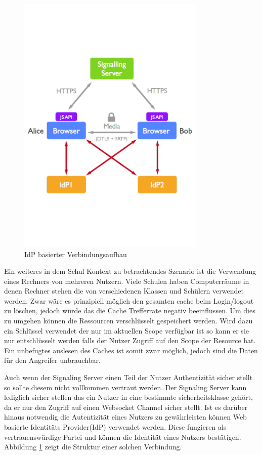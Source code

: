 \begin{figure}[!h]
	\centering
	\includegraphics[width=0.8\textwidth]{figures/user_auth}
	\caption[A Figure Short-Title]{IdP basierter Verbindungsaufbau\cite{rtcweb-security}}
	\label{fig:user_auth}
\end{figure}

Ein weiteres in dem Schul Kontext zu betrachtendes Szenario ist die Verwendung eines Rechners von mehreren Nutzern. Viele Schulen haben Computerräume in denen Rechner stehen die von verschiedenen Klassen und Schülern verwendet werden. Zwar wäre es prinzipiell möglich den gesamten cache beim Login/logout zu löschen, jedoch würde das die Cache Trefferrate negativ beeinflussen. Um dies zu umgehen können die Ressourcen verschlüsselt gespeichert werden. Wird dazu ein Schlüssel verwendet der nur im aktuellen Scope verfügbar ist so kann er sie nur entschlüsselt werden falls der Nutzer Zugriff auf den Scope der Resource hat. Ein unbefugtes auslesen des Caches ist somit zwar möglich, jedoch sind die Daten für den Angreifer unbrauchbar.

Auch wenn der Signaling Server einen Teil der Nutzer Authentizität sicher stellt so sollte diesem nicht vollkommen vertraut werden. Der Signaling Server kann lediglich sicher stellen das ein Nutzer in eine bestimmte sicherheitsklasse gehört, da er nur den Zugriff auf einen Websocket Channel sicher stellt. Ist es darüber hinaus notwendig die Autentizität eines Nutzers zu gewährleisten können Web basierte Identitäts Provider(IdP) verwendet werden. Diese fungieren als vertrauenswürdige Partei und können die Identität eines Nutzers bestätigen. Abbildung \ref{fig:user_auth} zeigt die Struktur einer solchen Verbindung.

